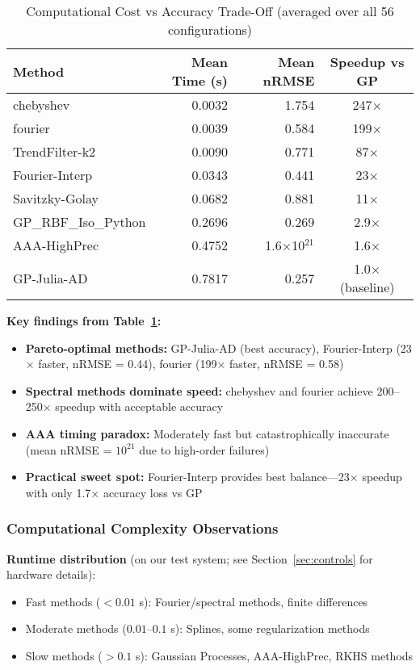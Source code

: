 \begin{table}[htbp]
\centering
\caption{Computational Cost vs Accuracy Trade-Off (averaged over all 56 configurations)}
\label{tab:timing_comparison}
\begin{tabular}{lrrc}
\toprule
\textbf{Method} & \textbf{Mean Time (s)} & \textbf{Mean nRMSE} & \textbf{Speedup vs GP} \\
\midrule
chebyshev & 0.0032 & 1.754 & 247$\times$ \\
fourier & 0.0039 & 0.584 & 199$\times$ \\
TrendFilter-k2 & 0.0090 & 0.771 & 87$\times$ \\
Fourier-Interp & 0.0343 & 0.441 & 23$\times$ \\
Savitzky-Golay & 0.0682 & 0.881 & 11$\times$ \\
GP\_RBF\_Iso\_Python & 0.2696 & 0.269 & 2.9$\times$ \\
AAA-HighPrec & 0.4752 & 1.6$\times$10$^{21}$ & 1.6$\times$ \\
GP-Julia-AD & 0.7817 & 0.257 & 1.0$\times$ (baseline) \\
\bottomrule
\end{tabular}
\end{table}

\textbf{Key findings from Table~\ref{tab:timing_comparison}:}
\begin{itemize}
    \item \textbf{Pareto-optimal methods:} GP-Julia-AD (best accuracy), Fourier-Interp (23$\times$ faster, nRMSE = 0.44), fourier (199$\times$ faster, nRMSE = 0.58)
    \item \textbf{Spectral methods dominate speed:} chebyshev and fourier achieve 200--250$\times$ speedup with acceptable accuracy
    \item \textbf{AAA timing paradox:} Moderately fast but catastrophically inaccurate (mean nRMSE = $10^{21}$ due to high-order failures)
    \item \textbf{Practical sweet spot:} Fourier-Interp provides best balance—23$\times$ speedup with only 1.7$\times$ accuracy loss vs GP
\end{itemize}

\subsubsection{Computational Complexity Observations}

\textbf{Runtime distribution} (on our test system; see Section~\ref{sec:controls} for hardware details):
\begin{itemize}
    \item Fast methods ($< 0.01$ s): Fourier/spectral methods, finite differences
    \item Moderate methods ($0.01$--$0.1$ s): Splines, some regularization methods
    \item Slow methods ($> 0.1$ s): Gaussian Processes, AAA-HighPrec, RKHS methods
\end{itemize}

